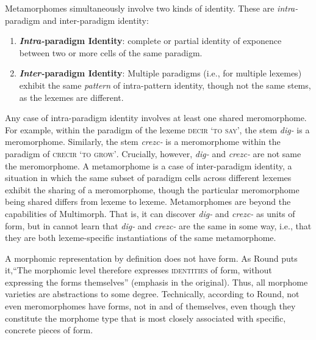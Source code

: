 	Metamorphomes simultaneously involve two kinds of identity. These are \emph{intra-}paradigm and {inter-}paradigm identity: 
	\begin{enumerate}
		\item \textbf{\emph{Intra-}paradigm Identity}: complete or partial identity of exponence between two or more cells of the same paradigm. 
		\item \textbf{\emph{Inter-}paradigm Identity}: Multiple paradigms (i.e., for multiple lexemes) exhibit the same \emph{pattern} of intra-pattern identity, though not the same stems, as the lexemes are different.
	\end{enumerate} 
Any case of intra-paradigm identity involves at least one shared 
meromorphome. For example, within the paradigm of the lexeme 
\textsc{decir} \textsc{`to say'}, 
the stem \textit{dig-} is a meromorphome. Similarly, the stem \textit{crezc-} 
is a meromorphome within the paradigm of 
\textsc{crecir} \textsc{`to grow'}. Crucially, however, 
\textit{dig-} and \textit{crezc-} are not same the meromorphome. 
A metamorphome is a case of inter-paradigm identity, a situation 
in which the same subset of paradigm cells across different lexemes 
exhibit the sharing of a meromorphome, 
though the particular meromorphome being shared differs from lexeme to 
lexeme. Metamorphomes are beyond the capabilities of Multimorph. 
That is, it can discover \textit{dig-} and \textit{crezc-} as units of form, 
but in cannot learn that \textit{dig-} and \textit{crezc-} are the same 
in some way, i.e., that they are both lexeme-specific instantiations of the
same metamorphome.

A morphomic representation by definition does not have form.
As Round puts it,``The morphomic level 
therefore expresses \textsc{identities} of form, without 
expressing the forms themselves'' \citep[][pp.220-221]{round:2011} (emphasis in the original).
Thus, all morphome varieties are abstractions to some degree. 
Technically, according to Round, not even 
meromorphomes have forms, not in and 
of themselves, even though they constitute the 
morphome type that is most closely associated with specific, concrete pieces of form. 

